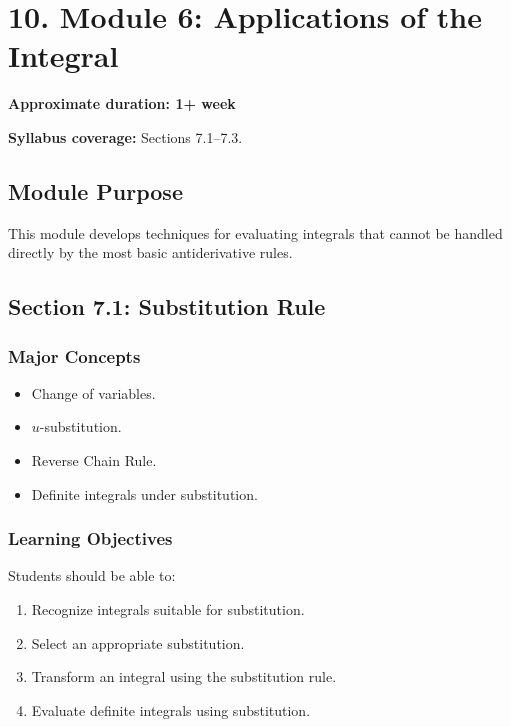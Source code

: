 \documentclass[11pt]{article}
\begin{document}
\section{10. Module 6: Applications of the Integral}

\textbf{Approximate duration: 1+ week}

\textbf{Syllabus coverage:} Sections 7.1--7.3.

\subsection{Module Purpose}

This module develops techniques for evaluating integrals that cannot be handled
directly by the most basic antiderivative rules.

\subsection{Section 7.1: Substitution Rule}

\subsubsection{Major Concepts}

\begin{itemize}
    \item Change of variables.
    \item $u$-substitution.
    \item Reverse Chain Rule.
    \item Definite integrals under substitution.
\end{itemize}

\subsubsection{Learning Objectives}

Students should be able to:

\begin{enumerate}
    \item Recognize integrals suitable for substitution.
    \item Select an appropriate substitution.
    \item Transform an integral using the substitution rule.
    \item Evaluate definite integrals using substitution.
\end{enumerate}
\end{document}
